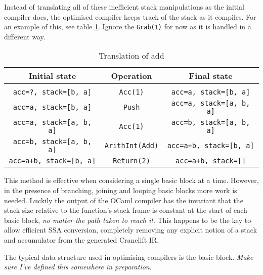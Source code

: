 Instead of translating all of these inefficient stack manipulations as the initial compiler does,
the optimised compiler keeps track of the stack as it compiles. For an example of this, see table
\ref{table:stacktrans}. Ignore the \texttt{Grab(1)} for
now as it is handled in a different way.

\begin{table}[h]
      \centering
      \begin{tabular}{ccc}\toprule
            Initial state                   & Operation              & Final state
            \\
            \midrule
            \\
            \texttt{acc=?, stack=[b, a]}    & \texttt{Acc(1)}        & \texttt{acc=a, stack=[b, a]}
            \\
            \texttt{acc=a, stack=[b, a]}    & \texttt{Push}          & \texttt{acc=a, stack=[a, b,
                              a]}
            \\
            \texttt{acc=a, stack=[a, b, a]} & \texttt{Acc(1)}        & \texttt{acc=b, stack=[a, b,
                              a]}
            \\
            \texttt{acc=b, stack=[a, b, a]} & \texttt{ArithInt(Add)} & \texttt{acc=a+b, stack=[b,
                              a]}
            \\
            \texttt{acc=a+b, stack=[b, a]}  & \texttt{Return(2)}     & \texttt{acc=a+b, stack=[]}
            \\
            \bottomrule
      \end{tabular}

      \caption{Translation of add}
      \label{table:stacktrans}
\end{table}

This method is effective when considering a single basic block at a time. However, in the presence
of branching, joining and looping basic blocks more work is needed. Luckily the output of the OCaml
compiler has the invariant that the stack size relative to the function's stack frame is constant
at the start of each basic block, \emph{no matter the path taken to reach it}. This happens to be
the key to allow efficient SSA conversion, completely removing any explicit notion of a stack and
accumulator from the generated Cranelift IR.

\label{opt-bb}

The typical data structure used in optimising compilers is the basic block. \emph{Make sure I've
      defined this somewhere in preparation}.

